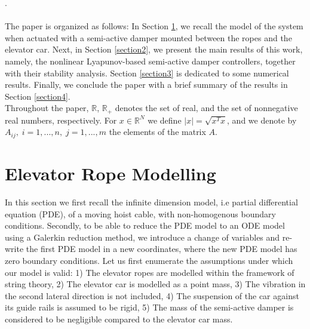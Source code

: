 \documentclass[letterpaper, 11 pt, conference]{ieeeconf}
\begin{document}
 \cite{B14}.
 \\\\The paper is organized as follows: In Section
 \ref{section1}, we recall the model of the system when actuated with a semi-active damper mounted between the ropes and the elevator car.
  Next, in Section \ref{section2}, we present the main results of this work, namely, the nonlinear
 Lyapunov-based semi-active damper controllers, together with their stability
 analysis. Section \ref{section3} is dedicated to some numerical
 results. Finally, we conclude the paper with a brief summary of the results in Section
 \ref{section4}.\\
Throughout the paper, $\mathbb{R}$, $\mathbb{R}_{+}$ denotes the
set of real, and the set of nonnegative real numbers,
respectively. For $x\in \mathbb{R}^{N}$ we define
 $|x|=\sqrt{x^{T}x}$, and we denote by $A_{ij},\;i=1,...,n,\;j=1,...,m$ the elements of the matrix $A$.
\section{Elevator Rope Modelling}\label{section1} In this section we first
recall the infinite dimension model, i.e partial differential
equation (PDE), of a moving hoist cable, with non-homogenous
boundary conditions. Secondly, to be able to reduce the PDE model
to an ODE model using a Galerkin reduction method, we introduce a
change of variables and re-write the first PDE model in a new
coordinates, where the new PDE model has zero boundary conditions.
Let us first enumerate the assumptions under which our model is
valid: 1) The elevator ropes are modelled within the framework of
string theory, 2) The elevator car is modelled as a point mass, 3)
The vibration in the second lateral direction is not included, 4)
The suspension of the car against its guide rails is assumed to be
rigid, 5) The mass of the semi-active damper is considered to be
negligible compared to the elevator car mass.
\end{document}
